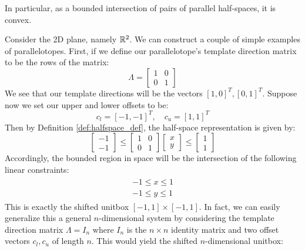 %
\noindent In particular, as a bounded intersection of pairs of parallel half-spaces, it is convex.
%
\begin{example}
\label{ex:simple_ptope}
Consider the 2D plane, namely ${\mathbb{R}}^2$. We can construct a couple of simple examples of parallelotopes. First, if we define our parallelotope's template direction matrix to be the rows of the matrix:
%
\begin{equation}
  \Lambda = \begin{bmatrix} 1 & 0 \\ 0 & 1 \end{bmatrix}
\end{equation}
%
We see that our template directions will be the vectors $[1,0]^T, [0,1]^T$. Suppose now we set our upper and lower offsets to be:
%
\begin{equation}
  c_l = [-1,-1]^T, \quad c_u = [1,1]^T
\end{equation}
Then by Definition \ref{def:halfspace_def}, the half-space representation is given by:
\begin{equation}
\begin{bmatrix}
  -1 \\ -1
\end{bmatrix} \leq \begin{bmatrix}
    1 & 0 \\ 0 & 1
  \end{bmatrix}\begin{bmatrix}
   x \\ y
  \end{bmatrix} \leq \begin{bmatrix}
    1 \\ 1
  \end{bmatrix}
\end{equation}
%
Accordingly, the bounded region in space will be the intersection of the following linear constraints:
%
\begin{align}
  \begin{split}
  -1 \leq x \leq 1 \\
  -1 \leq y \leq 1
  \end{split}
\end{align}
This is exactly the shifted unitbox $[-1,1] \times [-1,1]$. In fact, we can easily generalize this a general $n$-dimensional system by considering the template direction matrix $\Lambda = I_n$ where $I_n$ is the $n \times n$ identity matrix and two offset vectors $c_l, c_u$ of length $n$. This would yield the shifted $n$-dimensional unitbox:


\end{example}
